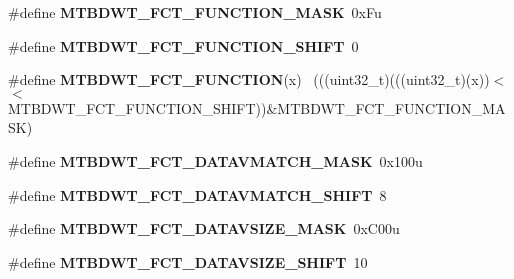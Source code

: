 \begin{DoxyCompactItemize}
\item 
\hypertarget{group___m_t_b_d_w_t___register___masks_ga05376c97e9f6d9af8d411be187d45d4c}{}\#define {\bfseries M\+T\+B\+D\+W\+T\+\_\+\+F\+C\+T\+\_\+\+F\+U\+N\+C\+T\+I\+O\+N\+\_\+\+M\+A\+S\+K}~0x\+Fu\label{group___m_t_b_d_w_t___register___masks_ga05376c97e9f6d9af8d411be187d45d4c}

\item 
\hypertarget{group___m_t_b_d_w_t___register___masks_gae855270584ab08b726fd88c288d2e605}{}\#define {\bfseries M\+T\+B\+D\+W\+T\+\_\+\+F\+C\+T\+\_\+\+F\+U\+N\+C\+T\+I\+O\+N\+\_\+\+S\+H\+I\+F\+T}~0\label{group___m_t_b_d_w_t___register___masks_gae855270584ab08b726fd88c288d2e605}

\item 
\hypertarget{group___m_t_b_d_w_t___register___masks_gac876a93af0063e7a677d23ec30367b75}{}\#define {\bfseries M\+T\+B\+D\+W\+T\+\_\+\+F\+C\+T\+\_\+\+F\+U\+N\+C\+T\+I\+O\+N}(x)                                  ~(((uint32\+\_\+t)(((uint32\+\_\+t)(x))$<$$<$M\+T\+B\+D\+W\+T\+\_\+\+F\+C\+T\+\_\+\+F\+U\+N\+C\+T\+I\+O\+N\+\_\+\+S\+H\+I\+F\+T))\&M\+T\+B\+D\+W\+T\+\_\+\+F\+C\+T\+\_\+\+F\+U\+N\+C\+T\+I\+O\+N\+\_\+\+M\+A\+S\+K)\label{group___m_t_b_d_w_t___register___masks_gac876a93af0063e7a677d23ec30367b75}

\item 
\hypertarget{group___m_t_b_d_w_t___register___masks_ga470cbefd664513c09ba77981a1b21cf2}{}\#define {\bfseries M\+T\+B\+D\+W\+T\+\_\+\+F\+C\+T\+\_\+\+D\+A\+T\+A\+V\+M\+A\+T\+C\+H\+\_\+\+M\+A\+S\+K}~0x100u\label{group___m_t_b_d_w_t___register___masks_ga470cbefd664513c09ba77981a1b21cf2}

\item 
\hypertarget{group___m_t_b_d_w_t___register___masks_ga97c08cb34ddc638585a0af94825ed2f5}{}\#define {\bfseries M\+T\+B\+D\+W\+T\+\_\+\+F\+C\+T\+\_\+\+D\+A\+T\+A\+V\+M\+A\+T\+C\+H\+\_\+\+S\+H\+I\+F\+T}~8\label{group___m_t_b_d_w_t___register___masks_ga97c08cb34ddc638585a0af94825ed2f5}

\item 
\hypertarget{group___m_t_b_d_w_t___register___masks_gac5562a9a6e64541583f2c3335e92e26e}{}\#define {\bfseries M\+T\+B\+D\+W\+T\+\_\+\+F\+C\+T\+\_\+\+D\+A\+T\+A\+V\+S\+I\+Z\+E\+\_\+\+M\+A\+S\+K}~0x\+C00u\label{group___m_t_b_d_w_t___register___masks_gac5562a9a6e64541583f2c3335e92e26e}

\item 
\hypertarget{group___m_t_b_d_w_t___register___masks_gab273df7e6bc41ff730a16ed3bda34c0d}{}\#define {\bfseries M\+T\+B\+D\+W\+T\+\_\+\+F\+C\+T\+\_\+\+D\+A\+T\+A\+V\+S\+I\+Z\+E\+\_\+\+S\+H\+I\+F\+T}~10\label{group___m_t_b_d_w_t___register___masks_gab273df7e6bc41ff730a16ed3bda34c0d}


\end{DoxyCompactItemize}
